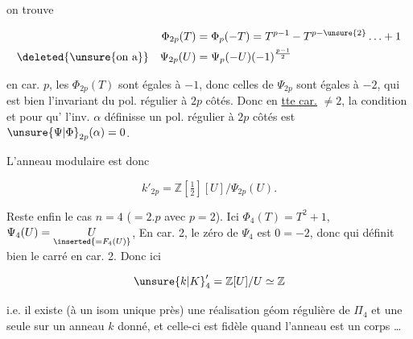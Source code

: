 
on trouve

\[
\begin{aligned}
\Phi_{2p}(T)&=\Phi_p(-T)=T^{p-1}-T^{p-\unsure{2}}\ldots+1\\
\deleted{\unsure{\text{on a}}}\quad\Psi_{2p}(U)&=\Psi_p(-U)(-1)^{\frac{p-1}{2}}
\end{aligned}
\]

en car. $p$, les    $\Phi_{2p}(T)$ sont égales à $-1$, donc celles de $\Psi_{2p}$ sont égales à $-2$, qui est bien l'invariant du pol. régulier à $2p$ côtés. Donc en \uline{tte car.} $\ne 2$, la condition  et  pour qu' l'inv. $\alpha$ définisse un pol. régulier à $2p$ côtés est $\unsure{\Psi|\Phi}_{2p}(\alpha)=0$.

L'anneau modulaire est donc

\[
k'_{2p}=\mathbb Z[\tfrac12][U]/\Psi_{2p}(U).
\]

Reste enfin le cas $n=4$ ($=2.p$ avec $p=2$). Ici $\Phi_4(T)=T^2+1$, $\Psi_4(U)=\underset{\inserted{=F_4(U)}}{U}$, En car. 2, le  zéro de $\Psi_4$ est $0=-2$, donc qui définit bien le carré en car. 2. Donc ici

\[
{\unsure{k|K}}'_4=\mathbb Z[U]/U\simeq\mathbb Z
\]

i.e. il existe (à un isom unique près) une réalisation géom régulière de $\Pi_4$ et une seule sur un anneau $k$ donné, et celle-ci est  fidèle quand l'anneau est un corps \ldots

